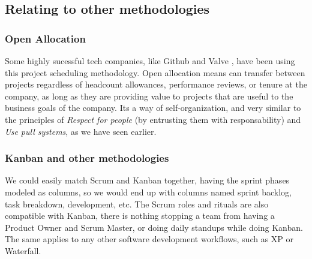 \documentclass[conference]{IEEEtran}
\begin{document}
\subsection{Relating to other methodologies}
\subsubsection{Open Allocation}
Some highly sucessful tech companies, like Github and Valve \cite{openalloc}, have been using
this project scheduling methodology. Open allocation means can transfer between
projects regardless of headcount allowances, performance reviews, or tenure at
the company, as long as they are providing value to projects that are useful to
the business goals of the company. Its a way of self-organization, and very
similar to the principles of \textit{Respect for people} (by entrusting them
with responsability) and \textit{Use pull systems}, as we have seen earlier.
\subsubsection{Kanban and other methodologies}
We could easily match Scrum and Kanban together, having the sprint phases modeled
as columns, so we would end up with columns named sprint backlog, task breakdown,
development, etc. The Scrum roles and rituals are also compatible with Kanban,
there is nothing stopping a team from having a Product Owner and Scrum Master,
or doing daily standups while doing Kanban.
The same applies to any other software development workflows, such
as XP or Waterfall.
\end{document}
